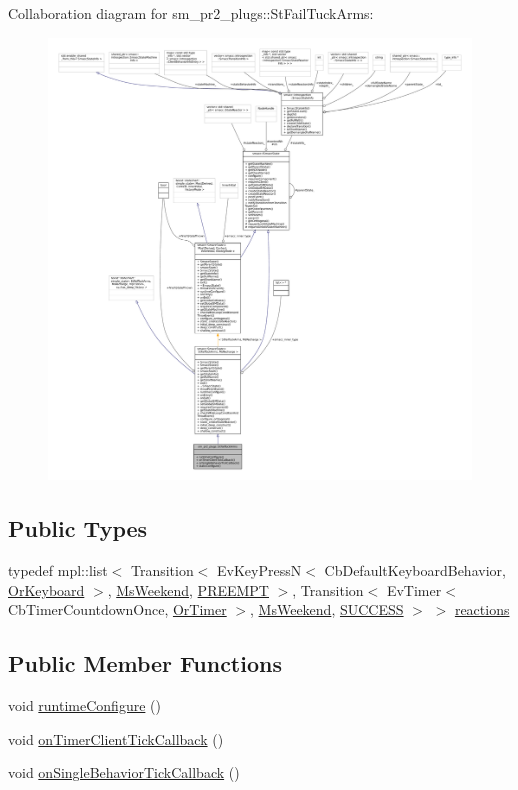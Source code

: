 Collaboration diagram for sm\+\_\+pr2\+\_\+plugs\+:\+:St\+Fail\+Tuck\+Arms\+:
\nopagebreak
\begin{figure}[H]
\begin{center}
\leavevmode
\includegraphics[width=350pt]{structsm__pr2__plugs_1_1StFailTuckArms__coll__graph}
\end{center}
\end{figure}
\subsection*{Public Types}
\begin{DoxyCompactItemize}
\item 
typedef mpl\+::list$<$ Transition$<$ Ev\+Key\+PressN$<$ Cb\+Default\+Keyboard\+Behavior, \hyperlink{classsm__pr2__plugs_1_1OrKeyboard}{Or\+Keyboard} $>$, \hyperlink{classsm__pr2__plugs_1_1MsWeekend}{Ms\+Weekend}, \hyperlink{classPREEMPT}{P\+R\+E\+E\+M\+PT} $>$, Transition$<$ Ev\+Timer$<$ Cb\+Timer\+Countdown\+Once, \hyperlink{classsm__pr2__plugs_1_1OrTimer}{Or\+Timer} $>$, \hyperlink{classsm__pr2__plugs_1_1MsWeekend}{Ms\+Weekend}, \hyperlink{classSUCCESS}{S\+U\+C\+C\+E\+SS} $>$ $>$ \hyperlink{structsm__pr2__plugs_1_1StFailTuckArms_aa275c126da6dae03665a112f335c98fb}{reactions}
\end{DoxyCompactItemize}
\subsection*{Public Member Functions}
\begin{DoxyCompactItemize}
\item 
void \hyperlink{structsm__pr2__plugs_1_1StFailTuckArms_aa120c686b41ea5ab0e55d4545757cc1d}{runtime\+Configure} ()
\item 
void \hyperlink{structsm__pr2__plugs_1_1StFailTuckArms_a4ef9ad7a1e3f13c41ad1903cc642bcb5}{on\+Timer\+Client\+Tick\+Callback} ()
\item 
void \hyperlink{structsm__pr2__plugs_1_1StFailTuckArms_a2e1def8b4845fef3c8ddfed50a7077cc}{on\+Single\+Behavior\+Tick\+Callback} ()
\end{DoxyCompactItemize}
